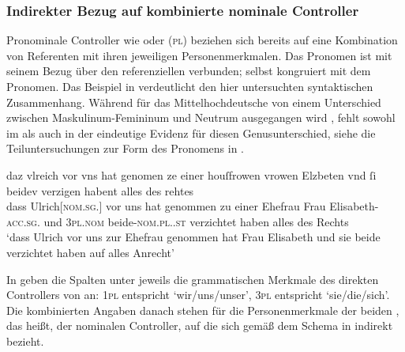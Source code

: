 \subsubsection{Indirekter Bezug auf kombinierte nominale Controller}
\label{subsubsec:beid2p2coordncao}

Pronominale Controller wie  oder  (\textsc{pl}) beziehen
sich bereits auf eine Kombination von Referenten mit ihren jeweiligen
Personenmerkmalen. Das Pronomen ist mit seinem Bezug über den referenziellen
 verbunden;  selbst kongruiert mit dem Pronomen. Das
Beispiel in  verdeutlicht den hier untersuchten
syntaktischen Zusammenhang. Während für das  Mittelhochdeutsche
von einem Unterschied zwischen Maskulinum-Femininum  und Neutrum
 ausgegangen wird \autocites[vgl.][213--214]{paul2007}[369,
390--397]{ksw2}, fehlt sowohl im \CAO{} als auch in der
\KC{} eindeutige Evidenz für diesen Genusunterschied, siehe die
Teiluntersuchungen zur Form des Pronomens in
.

\begin{exe}
\ex\label{ex:beid2p2coordncao}
	\gll daz vlreich \textelp{} vor vns hat genomen ze einer houſfrowen vrowen
			Elzbeten \textelp{} vnd ſi beidev \textelp{} verzigen habent
			\textelp{} alles des rehtes \\
		dass Ulrich[\textsc{nom.sg.\MascM}] {} vor uns hat genommen zu einer
			Ehefrau Frau Elisabeth-\textsc{acc.sg.\FemF} {} und
			\textsc{3pl\subMF{}.nom} beide-\textsc{nom.pl.\NeutMF.st} {}
			verzichtet haben {} alles des Rechts \\
		\trans `dass Ulrich \textelp{} vor uns zur Ehefrau
			genommen hat Frau Elisabeth \textelp{} und sie beide \textelp{}
			verzichtet haben auf alles Anrecht'
				\parencites(Nr.~2843, Salzburg, 1297)[175,22--25]{cao4}
\end{exe}

In  geben die Spalten unter  jeweils
die grammatischen Merkmale des direkten Controllers von  an:
\textsc{1pl} entspricht `wir/uns/unser', \textsc{3pl} entspricht `sie/die/sich'.
Die kombinierten Angaben danach stehen für die Personen\-merkmale der beiden
, das heißt, der nominalen Controller, auf die sich
 gemäß dem Schema in  indirekt
bezieht.

